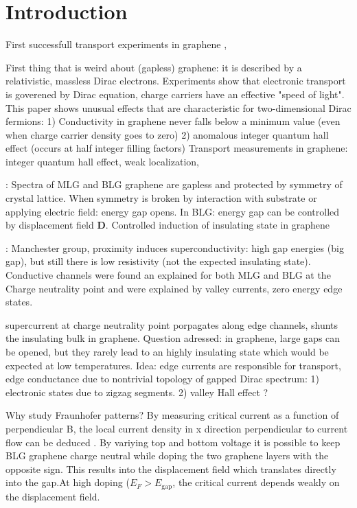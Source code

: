 \chapter{Introduction}
\label{ch:introduction}

First successfull transport experiments in graphene \cite{Zhang2005}, \cite{Novoselov2005}

First thing that is weird about (gapless) graphene: it is described by a relativistic, massless Dirac electrons. Experiments \cite{Novoselov2005} show that electronic transport is goverened by Dirac equation, charge carriers have an effective "speed of light". This paper shows unusual effects that are characteristic for two-dimensional Dirac fermions: 1) Conductivity in graphene never falls below a minimum value (even when charge carrier density goes to zero) 2) anomalous integer quantum hall effect (occurs at half integer filling factors)
Transport measurements in graphene: integer quantum hall effect, weak localization, 

\cite{Zhu2017}: Spectra of MLG and BLG graphene are gapless and protected by symmetry of crystal lattice. When symmetry is broken by interaction with substrate or applying electric field: energy gap opens. In BLG: energy gap can be controlled by displacement field $\mathbf{D}$. Controlled induction of insulating state in graphene \cite{Oostinga2008}

\cite{Zhu2017}: Manchester group, proximity induces superconductivity: high gap energies (big gap), but still there is low resistivity (not the expected insulating state). Conductive channels were found an explained for both MLG and BLG at the Charge neutrality point and were explained by valley currents, zero energy edge states. 

supercurrent at charge neutrality point porpagates along edge channels, shunts the insulating bulk in graphene. Question adressed: in graphene, large gaps can be opened, but they rarely lead to an highly insulating state which would be expected at low temperatures. Idea: edge currents are responsible for transport, edge conductance due to nontrivial topology of gapped Dirac spectrum: 1) electronic states due to zigzag segments. 2) valley Hall effect ?

Why study Fraunhofer patterns? By measuring critical current as a function of perpendicular B, the local current density in x direction perpendicular to current flow can be deduced \cite{Dynes1971}. By variying top and bottom voltage it is possible to keep BLG graphene charge neutral while doping the two graphene layers with the opposite sign. This results into the displacement field which translates directly into the gap.At high doping ($E_F > E_\text{gap}$, the critical current depends weakly on the displacement field.

